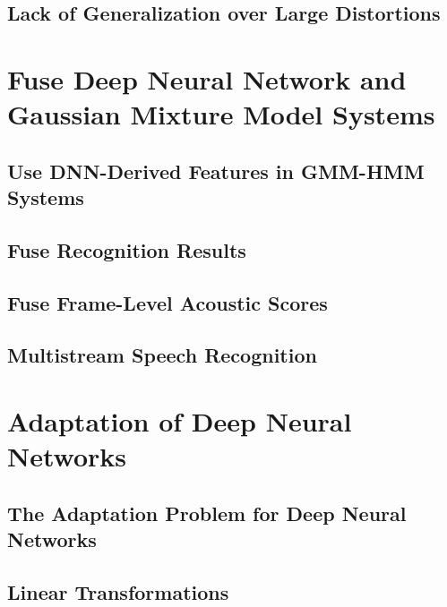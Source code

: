 \documentclass[a4paper]{article}
\begin{document}
\subsection{Lack of Generalization over Large Distortions}


\newpage
\section{Fuse Deep Neural Network and Gaussian Mixture Model Systems}
\subsection{Use DNN-Derived Features in GMM-HMM Systems}

\subsection{Fuse Recognition Results}

\subsection{Fuse Frame-Level Acoustic Scores}

\subsection{Multistream Speech Recognition}


\newpage
\section{Adaptation of Deep Neural Networks}
\subsection{The Adaptation Problem for Deep Neural Networks}

\subsection{Linear Transformations}
\end{document}
